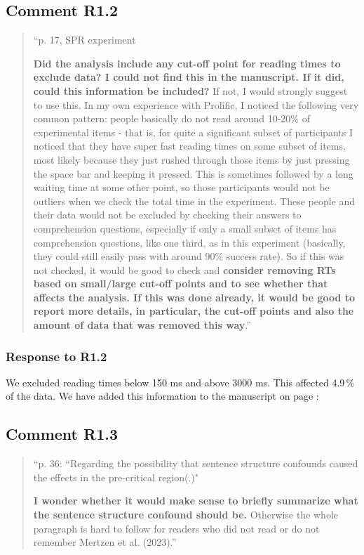 \documentclass[12pt]{article}
\begin{document}
\subsection*{Comment R1.2}

\begin{quote}
``p. 17, SPR experiment

\textbf{Did the analysis include any cut-off point for reading times to exclude data? I could not find this in the manuscript. If it did, could this information be included?} If not, I would strongly suggest to use this. In my own experience with Prolific, I noticed the following very common pattern: people basically do not read around 10-20\% of experimental items - that is, for quite a significant subset of participants I noticed that they have super fast reading times on some subset of items, most likely because they just rushed through those items by just pressing the space bar and keeping it pressed. This is sometimes followed by a long waiting time at some other point, so those participants would not be outliers when we check the total time in the experiment. These people and their data would not be excluded by checking their answers to comprehension questions, especially if only a small subset of items has comprehension questions, like one third, as in this experiment (basically, they could still easily pass with around 90\% success rate). So if this was not checked, it would be good to check and \textbf{consider removing RTs based on small/large cut-off points and to see whether that affects the analysis. If this was done already, it would be good to report more details, in particular, the cut-off points and also the amount of data that was removed this way}.''
\end{quote}

\subsubsection*{Response to R1.2}
We excluded reading times below 150 ms and above 3000 ms. This affected 4.9\,\% of the data. We have added this information to the manuscript on page \pageref{trim}:

\begin{quote}
\end{quote}

\subsection*{Comment R1.3}
\begin{quote}
``p. 36: ``Regarding the possibility that sentence structure confounds caused the effects in the pre-critical region(.)"

\textbf{I wonder whether it would make sense to briefly summarize what the sentence structure confound should be.} Otherwise the whole paragraph is hard to follow for readers who did not read or do not remember Mertzen et al. (2023).''
\end{quote}
\end{document}
